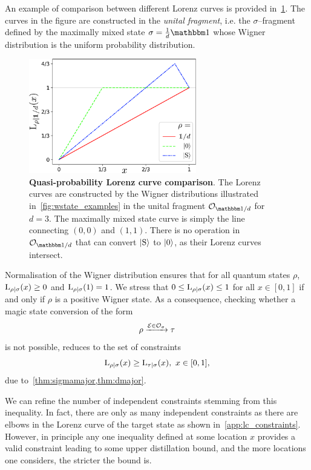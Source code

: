 \documentclass[pra,
aps,
twocolumn,
superscriptaddress,
groupedaddress,
nofootinbib,
reprint
]{revtex4-1}
\begin{document}
An example of comparison between different Lorenz curves is provided in~\cref{fig:lctoy}.
The curves in the figure are constructed in the \emph{unital fragment}, i.e. the $\sigma$--fragment defined by the maximally mixed state $\sigma = \frac{1}{d}\id$ whose Wigner distribution is the uniform probability distribution.
\begin{figure}
    \centering
    \includegraphics[height=5cm]{figs/lctoy.pdf}
    \caption{\textbf{Quasi-probability Lorenz curve comparison}.
    The Lorenz curves are constructed by the Wigner distributions illustrated in~\cref{fig:wstate_examples} in the unital fragment $\O_{\id/d}$ for $d=3$.
    The maximally mixed state curve is simply the line connecting $(0,0)$ and $(1,1)$.
    There is no operation in $\O_{\id/d}$ that can convert $\ket{\rm{S}}$ to $\ket{0}$, as their Lorenz curves intersect.
    }
    \label{fig:lctoy}
\end{figure}

Normalisation of the Wigner distribution  ensures that for all quantum states $\rho$, ${{\rm{L}}_{\rho|\sigma}}(x) \geq 0$ and ${{\rm{L}}_{\rho|\sigma}}(1) = 1$.
We stress that $0 \leq {{\rm{L}}_{\rho|\sigma}}(x) \leq 1$ for all $x \in [0,1]$ if and only if $\rho$ is a positive Wigner state.
As a consequence, checking whether a magic state conversion of the form
\begin{equation}\label{eq:sigma_conv}
	\rho \xrightarrow{\mathcal{E} \in \mathcal{O}_\sigma} \tau
\end{equation} 
is not possible, reduces to the set of constraints
\begin{equation}\label{eq:majbound}
    {{\rm{L}}_{\rho|\sigma}}(x) \geq {{\rm{L}}_{\tau|\sigma}}(x),\ x\in [0,1],
\end{equation}
due to~\cref{thm:sigmamajor,thm:dmajor}.

We can refine the number of independent constraints stemming from this inequality. 
In fact, there are only as many independent constraints as there are elbows in the Lorenz curve of the target state as shown in~\cref{app:lc_constraints}.
However, in principle any one inequality defined at some location $x$ provides a valid constraint leading to some upper distillation bound, and the more locations one considers, the stricter the bound is.
\end{document}
